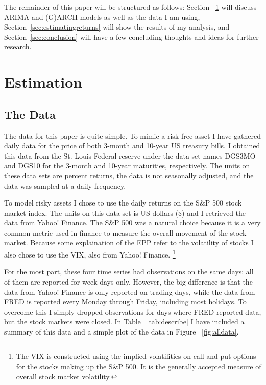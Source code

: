 \documentclass[a4paper, 11pt, twoside]{article}
\theoremstyle{definition} %
\numberwithin{equation}{section}
\begin{document}
  The remainder of this paper will be structured as follows: Section ~\ref{sec:estimation} will discuss ARIMA and (G)ARCH models as well as the data I am using, Section~\ref{sec:estimatingreturns} will show the results of my analysis, and Section~\ref{sec:conclusion} will have a few concluding thoughts and ideas for further research.

\section{Estimation} \label{sec:estimation}

  \subsection{The Data} \label{sub:the_data}

    The data for this paper is quite simple. To mimic a risk free asset I have gathered daily data for the price of both 3-month and 10-year US treasury bills. I obtained this data from the St. Louis Federal reserve under the data set names DGS3MO and DGS10 for the 3-month and 10-year maturities, respectively. The units on these data sets are percent returns, the data is not seasonally adjusted, and the data was sampled at a daily frequency.

    To model risky assets I chose to use the daily returns on the S\&P 500 stock market index.  The units on this data set is US dollars (\$) and I retrieved the data from Yahoo! Finance. The S\&P 500 was a natural choice because it is a very common metric used in finance to measure the overall movement of the stock market. Because some explaination of the EPP refer to the volatility of stocks I also chose to use the VIX, also from Yahoo! Finance. \footnote{The VIX is constructed using the implied volatilities on call and put options for the stocks making up the S\&P 500. It is the generally accepted measure of overall stock market volatility.}

    For the most part, these four time series had observations on the same days: all of them are reported for week-days only. However, the big difference is that the data from Yahoo! Finance is only reported on trading days, while the data from FRED is reported every Monday through Friday, including most holidays. To overcome this I simply dropped observations for days where FRED reported data, but the stock markets were closed. In Table ~\ref{tab:describe} I have included a summary of this data and a simple plot of the data in Figure ~\ref{fig:alldata}.
\end{document}
